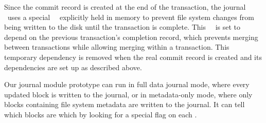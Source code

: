 Since the commit record is created at the end of the transaction, the journal
\module\ uses a special \noop\ \patch\ explicitly held in memory to prevent
file system changes from being written to the disk until the transaction is
complete. This \noop\ \patch\ is set to depend on the previous transaction's
completion record, which prevents merging between transactions while allowing
merging within a transaction. This temporary dependency is removed when the
real commit record is created and its dependencies are set up as described
above.

\begin{comment}
Almost all of this description of journaling translates directly into \patch\
dependencies. The incoming \patches\ must be rearranged to implement the new
structure, but for the most part this transformation is straightforward. There
are two special considerations which the journal \module\ must address, however.

First, with soft updates, \patches\ can always be written to the disk when
flushing the cache, while the journal must be able to ``lock'' \patches\ into
the cache while transactions are in progress. To accomplish this, the journal
\module\ uses a managed \noop\ \patch, as outlined in
Section~\ref{sec:patch:noop}.

Second, the commit record is created at the end of the transaction, but the file
system changes created during the transaction must be made to depend on it.
Ordinarily this is not permitted (see \S\ref{sec:patch:nrb}). The condition for
violating this rule is a static proof that no cycle can result from doing so
(immediately or in the future); we have determined this to be the case for the
journal \module\ by hand.
\end{comment}

\begin{comment}
Due to this design, the journal \module\ is completely independent of any
specific file system. It is a block device \module\ that automatically journals
whatever file system is stored on it. In fact, the incoming \patches\ need not
be arranged for soft updates, or for that matter in any particular configuration
at all.
\end{comment}


Our journal module prototype can run in full data journal mode, where every
updated block is written to the journal, or in metadata-only mode, where only
blocks containing file system metadata are written to the journal. It can
tell which blocks are which by looking for a special flag on each \patch.
